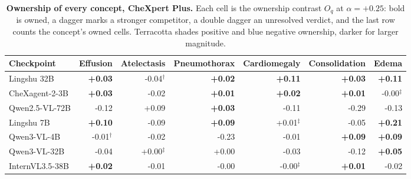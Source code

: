 \documentclass{article}
\begin{document}
\begin{table}[htbp]
\centering
\scriptsize
\setlength{\tabcolsep}{4pt}
\caption{\textbf{Ownership of every concept, CheXpert Plus.} Each cell is the ownership contrast $O_q$ at $\alpha=+0.25$: bold is owned, a dagger marks a stronger competitor, a double dagger an unresolved verdict, and the last row counts the concept's owned cells. Terracotta shades positive and blue negative ownership, darker for larger magnitude.}
\label{tab:cf-own-chexpert}
\begin{tabular}{lrrrrrr}
\toprule
Checkpoint & \multicolumn{1}{c}{Effusion} & \multicolumn{1}{c}{Atelectasis} & \multicolumn{1}{c}{Pneumothorax} & \multicolumn{1}{c}{Cardiomegaly} & \multicolumn{1}{c}{Consolidation} & \multicolumn{1}{c}{Edema}\\
\midrule
Lingshu 32B & \cellcolor{cfTerra2}\textbf{+0.03} & \cellcolor{cfSlate2}-0.04$^{\dagger}$ & \cellcolor{cfTerra2}\textbf{+0.02} & \cellcolor{cfTerra3}\textbf{+0.11} & \cellcolor{cfTerra2}\textbf{+0.03} & \cellcolor{cfTerra3}\textbf{+0.11} \\
CheXagent-2-3B & \cellcolor{cfTerra2}\textbf{+0.03} & \cellcolor{cfSlate2}-0.02 & \cellcolor{cfTerra1}\textbf{+0.01} & \cellcolor{cfTerra1}\textbf{+0.02} & \cellcolor{cfTerra1}\textbf{+0.01} & \cellcolor{cfSlate1}-0.00$^{\ddagger}$ \\
Qwen2.5-VL-72B & \cellcolor{cfSlate3}-0.12 & \cellcolor{cfTerra2}+0.09 & \cellcolor{cfTerra2}\textbf{+0.03} & \cellcolor{cfSlate3}-0.11 & \cellcolor{cfSlate4}-0.29 & \cellcolor{cfSlate3}-0.13 \\
Lingshu 7B & \cellcolor{cfTerra2}\textbf{+0.10} & \cellcolor{cfSlate2}-0.09 & \cellcolor{cfTerra2}\textbf{+0.09} & \cellcolor{cfTerra1}+0.01$^{\ddagger}$ & \cellcolor{cfSlate2}-0.05 & \cellcolor{cfTerra3}\textbf{+0.21} \\
Qwen3-VL-4B & \cellcolor{cfSlate1}-0.01$^{\dagger}$ & \cellcolor{cfSlate1}-0.02 & \cellcolor{cfSlate3}-0.23 & \cellcolor{cfSlate1}-0.01 & \cellcolor{cfTerra2}\textbf{+0.09} & \cellcolor{cfTerra2}\textbf{+0.09} \\
Qwen3-VL-32B & \cellcolor{cfSlate2}-0.04 & \cellcolor{cfTerra1}+0.00$^{\ddagger}$ & \cellcolor{cfTerra1}+0.00 & \cellcolor{cfSlate2}-0.03 & \cellcolor{cfSlate3}-0.12 & \cellcolor{cfTerra2}\textbf{+0.05} \\
InternVL3.5-38B & \cellcolor{cfTerra1}\textbf{+0.02} & \cellcolor{cfSlate1}-0.01 & \cellcolor{cfSlate1}-0.00 & \cellcolor{cfSlate1}-0.00$^{\ddagger}$ & \cellcolor{cfTerra1}\textbf{+0.01} & \cellcolor{cfSlate2}-0.02 \\

\end{tabular}
\end{table}
\end{document}
